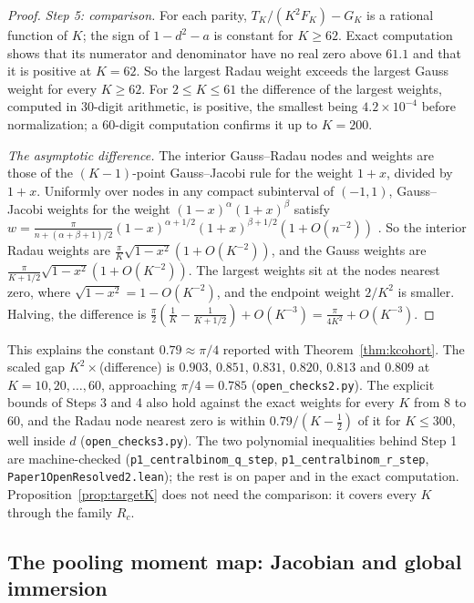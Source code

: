 \begin{proof}
\emph{Step 5: comparison.} For each parity, $T_K/(K^2F_K)-G_K$ is a rational function of $K$; the sign of $1-d^2-a$ is constant for $K\ge62$. Exact computation shows that its numerator and denominator have no real zero above $61.1$ and that it is positive at $K=62$. So the largest Radau weight exceeds the largest Gauss weight for every $K\ge62$. For $2\le K\le61$ the difference of the largest weights, computed in 30-digit arithmetic, is positive, the smallest being $4.2\times10^{-4}$ before normalization; a 60-digit computation confirms it up to $K=200$.

\emph{The asymptotic difference.} The interior Gauss--Radau nodes and weights are those of the $(K-1)$-point Gauss--Jacobi rule for the weight $1+x$, divided by $1+x$. Uniformly over nodes in any compact subinterval of $(-1,1)$, Gauss--Jacobi weights for the weight $(1-x)^\alpha(1+x)^\beta$ satisfy $w=\frac{\pi}{n+(\alpha+\beta+1)/2}(1-x)^{\alpha+1/2}(1+x)^{\beta+1/2}(1+O(n^{-2}))$ \citep{hale2013}. So the interior Radau weights are $\frac\pi K\sqrt{1-x^2}(1+O(K^{-2}))$, and the Gauss weights are $\frac\pi{K+1/2}\sqrt{1-x^2}(1+O(K^{-2}))$. The largest weights sit at the nodes nearest zero, where $\sqrt{1-x^2}=1-O(K^{-2})$, and the endpoint weight $2/K^2$ is smaller. Halving, the difference is $\frac\pi2(\frac1K-\frac1{K+1/2})+O(K^{-3})=\frac\pi{4K^2}+O(K^{-3})$.
\end{proof}

This explains the constant $0.79\approx\pi/4$ reported with Theorem~\ref{thm:kcohort}. The scaled gap $K^2\times$(difference) is $0.903$, $0.851$, $0.831$, $0.820$, $0.813$ and $0.809$ at $K=10,20,\ldots,60$, approaching $\pi/4=0.785$ (\nolinkurl{open_checks2.py}). The explicit bounds of Steps 3 and 4 also hold against the exact weights for every $K$ from 8 to 60, and the Radau node nearest zero is within $0.79/(K-\frac12)$ of it for $K\le300$, well inside $d$ (\nolinkurl{open_checks3.py}). The two polynomial inequalities behind Step 1 are machine-checked (\texttt{p1\_centralbinom\_q\_step}, \texttt{p1\_centralbinom\_r\_step}, \nolinkurl{Paper1OpenResolved2.lean}); the rest is on paper and in the exact computation. Proposition~\ref{prop:targetK} does not need the comparison: it covers every $K$ through the family $R_c$.

\subsection{The pooling moment map: Jacobian and global immersion}\label{app:jacobian}

